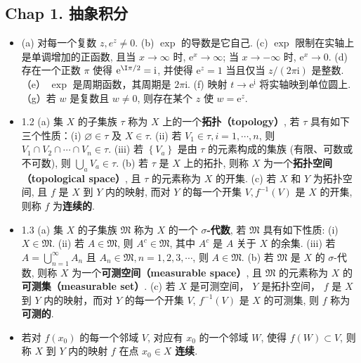 
\subsection{Chap 1. 抽象积分}
\begin{itemize}
\item (a) 对每一个复数 $z, e^{z} \neq 0$. (b) $\exp$ 的导数是它自己. (c) $\exp$ 限制在实轴上是单调增加的正函数, 且当 $x \rightarrow \infty$ 时, $\mathrm{e}^{x} \rightarrow \infty$; 当 $x \rightarrow-\infty$ 时, $\mathrm{e}^{x} \rightarrow 0$.
(d) 存在一个正数 $\pi$ 使得 $\mathrm{e}^{\I\pi / 2}=\mathrm{i}$, 并使得 $\mathrm{e}^{z}=1$ 当且仅当 $z /(2 \pi \mathrm{i})$ 是整数.（e） $\exp$ 是周期函数，其周期是 $2 \pi \mathrm{i}$. (f) 映射 $t \rightarrow \mathrm{e}^{\mathrm{i}}$ 将实轴映到单位圆上. （g）若 $w$ 是复数且 $w \neq 0$, 则存在某个 $z$ 使 $w=\mathrm{e}^{z}$.

\item 1.2 (a) 集 $X$ 的子集族 $\tau$ 称为 $X$ 上的一个\textbf{拓扑（topology）}, 若 $\tau$ 具有如下三个性质：(i) $\varnothing \in \tau$ 及 $X \in \tau$. (ii) 若 $V_{1} \in \tau, i=1, \cdots, n$, 则 $V_{1} \cap V_{2} \cap \cdots \cap V_{n} \in \tau$. (iii) 若 $\left\{V_{a}\right\}$ 是由 $\tau$ 的元素构成的集族 (有限、可数或不可数), 则 $\bigcup_{a} V_{a} \in \tau$. (b) 若 $\tau$ 是 $X$ 上的拓扑, 则称 $X$ 为一个\textbf{拓扑空间（topological space）}, 且 $\tau$ 的元素称为 $X$ 的开集. (c) 若 $X$ 和 $Y$ 为拓扑空间, 且 $f$ 是 $X$ 到 $Y$ 内的映射, 而对 $Y$ 的每一个开集 $V, f^{-1}(V)$ 是 $X$ 的开集, 则称 $f$ 为\textbf{连续的}.

\item 1.3 (a) 集 $X$ 的子集族 $\mathfrak{M}$ 称为 $X$ 的一个 \textbf{$\sigma$-代数}, 若 $\mathfrak{M}$ 具有如下性质: (i) $X \in \mathfrak{M}$. (ii) 若 $A \in \mathfrak{M}$, 则 $A^{c} \in \mathfrak{M}$, 其中 $A^{c}$ 是 $A$ 关于 $X$ 的余集. (iii) 若 $A=\bigcup_{n=1}^{\infty} A_{n}$ 且 $A_{n} \in \mathfrak{M}, n=1,2,3, \cdots$, 则 $A \in \mathfrak{M}$. (b) 若 $\mathfrak{M}$ 是 $X$ 的 $\sigma$-代数, 则称 $X$ 为一个\textbf{可测空间（measurable space）}, 且 $\mathfrak{M}$ 的元素称为 $X$ 的\textbf{可测集（measurable set）}. (c) 若 $X$ 是可测空间， $Y$ 是拓扑空间， $f$ 是 $X$ 到 $Y$ 内的映射，而对 $Y$ 的每一个开集 $V$, $f^{-1}(V)$ 是 $X$ 的可测集, 则 $f$ 称为\textbf{可测的}.

\item 若对 $f\left(x_{0}\right)$ 的每一个邻域 $V$, 对应有 $x_{0}$ 的一个邻域 $W$, 使得 $f(W) \subset V$, 则称 $X$ 到 $Y$ 内的映射 $f$ 在点 $x_{0} \in X$ \textbf{连续}.


\end{itemize}
